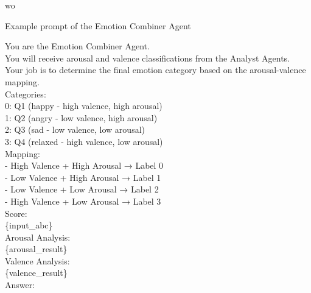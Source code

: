 wo\documentclass[sigconf]{acmart}
\begin{document}
\begin{promptbox}{Example prompt of the Emotion Combiner Agent}

You are the Emotion Combiner Agent.\\

You will receive arousal and valence classifications from the Analyst Agents.\\
Your job is to determine the final emotion category based on the arousal-valence mapping.\\

Categories:\\
0: Q1 (happy   - high valence, high arousal)\\
1: Q2 (angry   - low  valence, high arousal)\\
2: Q3 (sad     - low  valence, low  arousal)\\
3: Q4 (relaxed - high valence, low  arousal)\\

Mapping:\\
- High Valence + High Arousal → Label 0\\
- Low Valence + High Arousal → Label 1\\
- Low Valence + Low Arousal → Label 2\\
- High Valence + Low Arousal → Label 3\\

Score:\\
\{input\_abc\}\\

Arousal Analysis:\\
\{arousal\_result\}\\

Valence Analysis:\\
\{valence\_result\}\\

Answer:
\end{promptbox}
\end{document}
